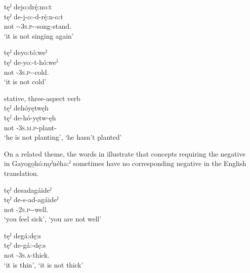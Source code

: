 \ex tęˀ dejo:drę́:no:t\\
\gll tęˀ de-j-o:-d-rę́:n-o:t \\
not {\negative}-{\repetitive}-\textsc{3s.p}-{\semireflexive}-song-stand.{\stative}\\
\glt `it is not singing again'


\ex tęˀ deyo:tó:weˀ  \\
\gll tęˀ de-yo:-t-hó:weˀ\\
not {\negative}-\textsc{3s.p}-{\semireflexive}-cold.{\stative}\\
\glt ‘it is not cold’
\z
\z

\ea\label{ex:negexample3} stative, three-aspect verb\\
tęˀ dehóyętwęh \\
\gll tęˀ de-hó-yętw-ęh\\
not {\negative}-\textsc{3s.m.p}-plant-{\stative}\\
\glt ‘he is not planting’, ‘he hasn’t planted’
\z 



On a related theme, the words in  illustrate that concepts requiring the negative in Gayogo̱hó:nǫˀnéha:ˀ sometimes have no corresponding negative in the English translation. 

\ea\label{ex:negex2}

\ea tęˀ desadagáideˀ  \\
\gll tęˀ de-s-ad-agáideˀ\\
not {\negative}-\textsc{2s.p}-{\semireflexive}-well.{\stative}\\
\glt ‘you feel sick’, ‘you are not well’

\ex tęˀ degá:dę:s  \\
\gll tęˀ de-gá:-dę:s\\
not {\negative}-\textsc{3s.a}-thick.{\stative}\\
\glt ‘it is thin’, ‘it is not thick’

